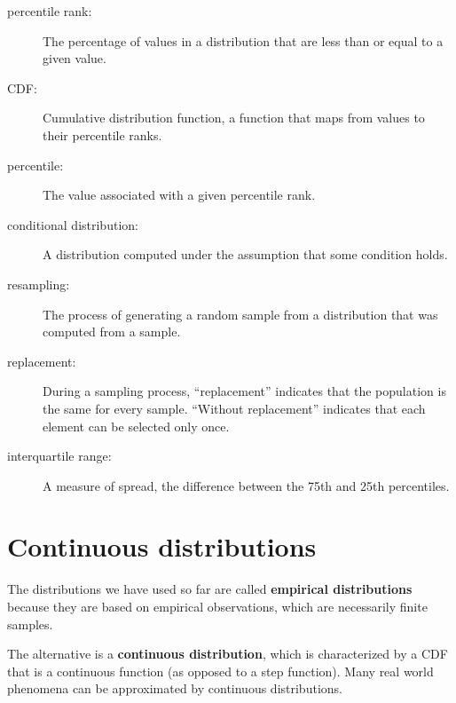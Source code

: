 \documentclass[12pt]{book}
\begin{document}
\begin{description}

\item[percentile rank:] The percentage of values in a distribution that are
less than or equal to a given value.

\item[CDF:] Cumulative distribution function, a function that maps
  from values to their percentile ranks.

\item[percentile:] The value associated with a given percentile rank.

\item[conditional distribution:] A distribution computed under the assumption
that some condition holds.

\item[resampling:] The process of generating a random sample from a
distribution that was computed from a sample.

\item[replacement:] During a sampling process, ``replacement'' indicates
that the population is the same for every sample.  ``Without replacement''
indicates that each element can be selected only once.

\item[interquartile range:] A measure of spread, the difference between
the 75th and 25th percentiles.

\end{description}



\chapter{Continuous distributions}
\label{continuous}

The distributions we have used so far are called {\bf
  empirical distributions} because they are based on empirical
observations, which are necessarily finite samples.

The alternative is a {\bf continuous distribution}, which is
characterized by a CDF that is a continuous function (as opposed to a
step function).  Many real world phenomena can be approximated by
continuous distributions.
\end{document}
